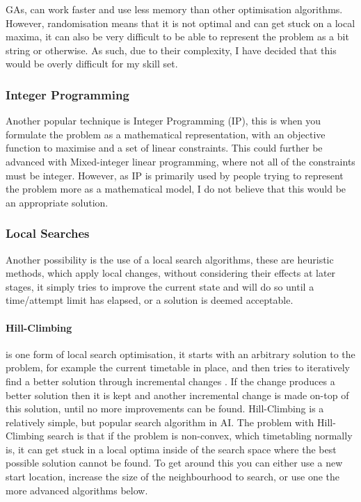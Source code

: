\documentclass{article}
\begin{document}
\par
GAs, can work faster and use less memory than other optimisation algorithms. However, randomisation means that it is not optimal and can get stuck on a local maxima, it can also be very difficult to be able to represent the problem as a bit string or otherwise. As such, due to their complexity, I have decided that this would be overly difficult for my skill set.  

\subsubsection{Integer Programming}
Another popular technique is Integer Programming (IP), this is when you formulate the problem as a mathematical representation, with an objective function to maximise and a set of linear constraints. This could further be advanced with Mixed-integer linear programming, where not all of the constraints must be integer. However, as IP is primarily used by people trying to represent the problem more as a mathematical model, I do not believe that this would be an appropriate solution. 

\subsubsection{Local Searches}
Another possibility is the use of a local search algorithms, these are heuristic methods, which apply local changes, without considering their effects at later stages, it simply tries to improve the current state and will do so until a time/attempt limit has elapsed, or a solution is deemed acceptable.

\paragraph{Hill-Climbing} is one form of local search optimisation, it starts with an arbitrary solution to the problem, for example the current timetable in place, and then tries to iteratively find a better solution through incremental changes \cite{RN36}. If the change produces a better solution then it is kept and another incremental change is made on-top of this solution, until no more improvements can be found. Hill-Climbing is a relatively simple, but popular search algorithm in AI. The problem with Hill-Climbing search is that if the problem is non-convex, which timetabling normally is, it can get stuck in a local optima inside of the search space where the best possible solution cannot be found. To get around this you can either use a new start location, increase the size of the neighbourhood to search, or use one the more advanced algorithms below.
\end{document}
